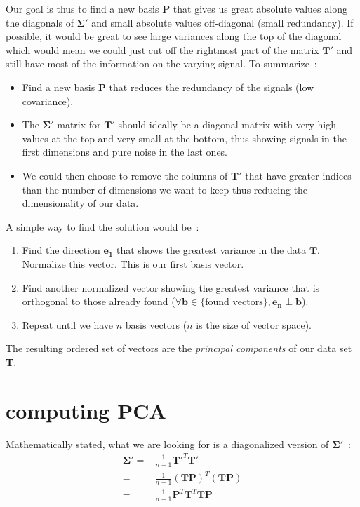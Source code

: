 \documentclass[11pt,twocolumn]{amsart} %
\newcommand{\ve}[1]{\boldsymbol{#1}}
\newcommand{\ma}[1]{\boldsymbol{#1}}
\begin{document}
Our goal is thus to find a new basis $\ma{P}$ that gives us great absolute values along the diagonals of $\ma\Sigma'$ and small absolute values off-diagonal (small redundancy). If possible, it would be great to see large variances along the top of the diagonal which would mean we could just cut off the rightmost part of the matrix $\ma{T'}$ and still have most of the information on the varying signal. To summarize~:
\begin{itemize}
  \item Find a new basis $\ma{P}$ that reduces the redundancy of the signals (low covariance).
  \item The $\ma\Sigma'$ matrix for $\ma{T'}$ should ideally be a diagonal matrix with very high values at the top and very small at the bottom, thus showing signals in the first dimensions and pure noise in the last ones.
  \item We could then choose to remove the columns of $\ma{T'}$ that have greater indices than the number of dimensions we want to keep thus reducing the dimensionality of our data.
\end{itemize}

A simple way to find the solution would be~:
\begin{enumerate}
  \item Find the direction $\ve{e_1}$ that shows the greatest variance in the data $\ma{T}$. Normalize this vector. This is our first basis vector.
  \item Find another normalized vector showing the greatest variance that is orthogonal to those already found ($\forall \ve{b}\in \{\text{found vectors}\}, \ve{e_n} \perp \ve{b}$).
  \item Repeat until we have $n$ basis vectors ($n$ is the size of vector space).
\end{enumerate}

The resulting ordered set of vectors are the \emph{principal components} of our data set \textbf{T}.

\section{computing PCA}

Mathematically stated, what we are looking for is a diagonalized version of $\ma\Sigma'$~:
\begin{align*}
  \ma\Sigma'     = & \frac{1}{n-1}\ma{T'}^T\ma{T'} \\
                 = & \frac{1}{n-1}(\ma{T}\ma{P})^T(\ma{T}\ma{P}) \\
                 = & \frac{1}{n-1}\ma{P}^T\ma{T}^T\ma{T}\ma{P}
\end{align*}
\end{document}
